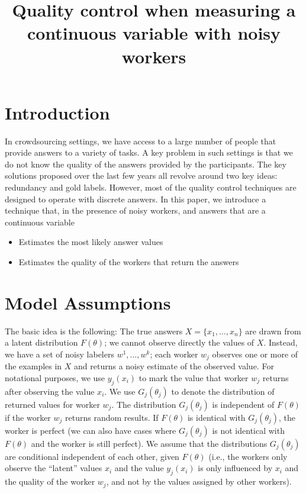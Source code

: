 \documentclass{article}
\begin{document}
\title{Quality control when measuring a continuous variable with noisy workers}

\maketitle

\section{Introduction}

In crowdsourcing settings, we have access to a large number of people that provide answers to a variety of tasks. A key problem in such settings is that we do not know the quality of the answers provided by the participants. The key solutions proposed over the last few years all revolve around two key ideas: redundancy and gold labels.  However, most of the quality control techniques are designed to operate with discrete answers. In this paper, we introduce a technique that, in the presence of noisy workers, and answers that are a continuous variable
\begin{itemize}
\item Estimates the most likely answer values
\item Estimates the quality of the workers that return the answers
\end{itemize}

\section{Model Assumptions}

The basic idea is the following: The true answers $X = \{ x_1, \ldots, x_n \}$ are drawn from a latent distribution $F(\theta)$; we cannot observe directly the values of $X$. Instead, we have a set of noisy labelers $w^1, \ldots, w^k$; each worker $w_j$ observes one or more of the examples in $X$ and returns a noisy estimate of the observed value. For notational purposes, we use 
$y_j(x_i)$ to mark the value that worker $w_j$ returns after observing the value $x_i$. We use $G_j(\theta_j)$ to denote the distribution of returned values for worker $w_j$. The distribution $G_j(\theta_j)$  is independent of $F(\theta)$ if the worker $w_j$ returns random results. If $F(\theta)$ is identical with $G_j(\theta_j)$, the worker is perfect (we can also have cases where $G_j(\theta_j)$ is not identical with $F(\theta)$ and the worker is still perfect). We assume that the distributions $G_j(\theta_j)$ are conditional independent of each other, given $F(\theta)$ (i.e., the workers only observe the ``latent'' values $x_i$ and the value $y_j(x_i)$ is only influenced by $x_i$ and the quality of the worker $w_j$, and not by the values assigned by other workers).
\end{document}
